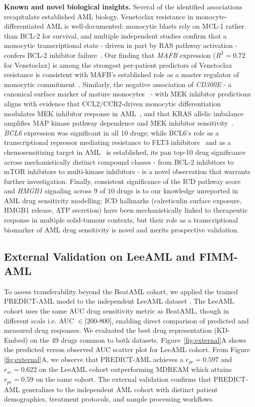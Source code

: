 \documentclass[pdflatex,sn-mathphys-num]{sn-jnl}
\theoremstyle{thmstyleone}
\theoremstyle{thmstyletwo}
\theoremstyle{thmstylethree}
\begin{document}
\noindent\textbf{Known and novel biological insights.} Several of the identified associations recapitulate established AML biology. Venetoclax resistance in monocyte-differentiated AML is well-documented: monocytic blasts rely on MCL-1 rather than BCL-2 for survival, and multiple independent studies confirm that a monocytic transcriptional state - driven in part by RAS pathway activation - confers BCL-2 inhibitor failure~\cite{kennedy2026ras, yashar2026pu1, mohanty2024venetoclax, allen2025venetoclax}. Our finding that \textit{MAFB} expression ($R^2 = 0.72$ for Venetoclax) is among the strongest per-patient predictors of Venetoclax resistance is consistent with MAFB's established role as a master regulator of monocytic commitment~\cite{ventura2025mafb, yang2015dnmt3a}. Similarly, the negative association of \textit{CD300E} - a canonical surface marker of mature monocytes~\cite{li2023cd300e} - with MEK inhibitor predictions aligns with evidence that CCL2/CCR2-driven monocytic differentiation modulates MEK inhibitor response in AML~\cite{modak2024targeting}, and that KRAS allelic imbalance amplifies MAP kinase pathway dependence and MEK inhibitor sensitivity~\cite{burgess2017kras, pedicona2022lsd1}. \textit{BCL6} expression was significant in all $10$ drugs; while BCL6's role as a transcriptional repressor mediating resistance to FLT3 inhibitors~\cite{zavorka2021bcl6} and as a chemosensitizing target in AML~\cite{zhang2023bcl6} is established, its pan top-10 drug significance across mechanistically distinct compound classes - from BCL-2 inhibitors to mTOR inhibitors to multi-kinase inhibitors - is a novel observation that warrants further investigation. Finally, consistent significance of the ICD pathway score and \textit{HMGB1} signaling across $9$ of $10$ drugs is to our knowledge unreported in AML drug sensitivity modelling: ICD hallmarks (calreticulin surface exposure, HMGB1 release, ATP secretion) have been mechanistically linked to therapeutic response in multiple solid-tumour contexts, but their role as a transcriptional biomarker of AML drug sensitivity is novel and merits prospective validation.
\subsection{External Validation on LeeAML and FIMM-AML}\label{sec3.6}
To assess transferability beyond the BeatAML cohort, we applied the trained PREDICT-AML model to the independent LeeAML dataset \cite{lee2018machine}. The LeeAML cohort uses the same AUC drug sensitivity metric as BeatAML, though in different scale i.e. AUC $\in [200$-$800]$, enabling direct comparison of predicted and measured drug responses. We evaluated the best drug representation (KD-Embed) on the 49 drugs common to both datasets. Figure~\ref{fig:external}A shows the predicted versus observed AUC scatter plot for LeeAML cohort. From Figure \ref{fig:external}A, we observe that PREDICT-AML achieves a $r_{pc}=0.597$ and $r_{sc}=0.622$ on the LeeAML cohort outperforming MDREAM \cite{trac2023prediction} which attains $r_{pc}=0.59$ on the same cohort. The external validation confirms that PREDICT-AML generalizes to the independent AML cohort with distinct patient demographics, treatment protocols, and sample processing workflows. 
\end{document}
